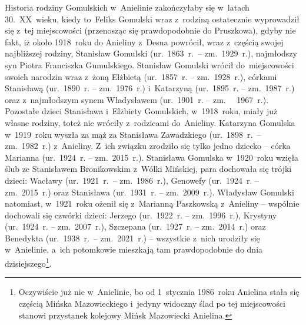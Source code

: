Historia rodziny Gomulskich w~Anielinie zakończyłaby się w~latach 30.~XX~wieku,
kiedy to~Feliks Gomulski wraz z~rodziną ostatecznie wyprowadził się 
z~tej miejscowości (przenosząc się prawdopodobnie do Pruszkowa), gdyby nie 
fakt, iż około 1918~roku do Anieliny z~Desna powrócił, wraz z~częścią swojej
najbliższej rodziny, Stanisław Gomulski (ur.~1863~r.~-- zm.~1929~r.),
najmłodszy syn Piotra Franciszka Gumulskiego. Stanisław Gomulski wrócił
do~miejscowości swoich narodzin wraz z~żoną Elżbietą (ur.~1857~r. -- zm.~1928~r.),
córkami Stanisławą (ur.~1890~r. -- zm.~1976~r.) i~Katarzyną (ur.~1895~r. --
zm.~1987~r.) oraz z~najmłodszym synem Władysławem (ur.~1901~r. -- zm.~~
1967~r.). Pozostałe dzieci Stanisława i~Elżbiety Gomulskich, w~1918~roku,
miały już własne rodziny, toteż nie wróciły z~rodzicami do~Anieliny. Katarzyna
Gomulska w~1919~roku wyszła za mąż za Stanisława Zawadzkiego (ur.~1898~r.~--
zm.~1982~r.) z~Anieliny. Z~ich związku zrodziło się tylko jedno dziecko --
córka Marianna (ur.~1924~r. -- zm.~2015~r.). Stanisława Gomulska w~1920~roku
wzięła ślub ze Stanisławem Bronikowskim z~Wólki Mińskiej, para dochowała się
trójki dzieci: Wacławy (ur.~1921~r.~-- zm.~1986~r.), Genowefy (ur.~1924~r. --
zm.~2015~r.) oraz Stanisława (ur.~1931~r. -- zm.~2009~r.). Władysław Gomulski
natomiast, w~1921~roku ożenił się z~Marianną Paszkowską z~Anieliny -- wspólnie
dochowali się czwórki dzieci: Jerzego (ur.~1922~r. -- zm.~1996~r.), Krystyny
(ur.~1924~r. -- zm.~2007~r.), Szczepana (ur.~1927~r. -- zm.~2014~r.) oraz
Benedykta (ur.~1938~r.~-- zm.~2021~r.) -- wszystkie z~nich urodziły się
w~Anielinie, a~ich potomkowie mieszkają tam prawdopodobnie do dnia
dzisiejszego\footnote{Oczywiście już nie w~Anielinie, bo od 1~stycznia
1986~roku Anielina stała się częścią Mińska Mazowieckiego i~jedyny widoczny
ślad po tej miejscowości stanowi przystanek kolejowy Mińsk Mazowiecki
Anielina.}.

\newpage
\null
\thispagestyle{empty}
\newpage



{}

